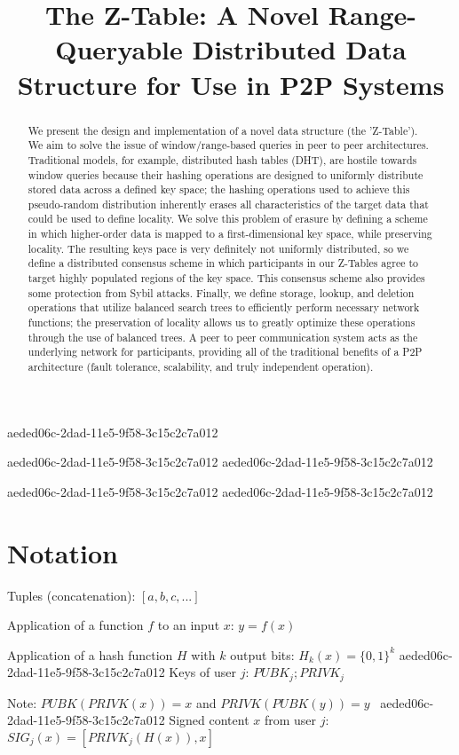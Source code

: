 \documentclass[12pt]{article}
\title{The Z-Table: A Novel Range-Queryable Distributed Data Structure for Use in P2P Systems}
\begin{document}
aeded06c-2dad-11e5-9f58-3c15c2c7a012\maketitle
aeded06c-2dad-11e5-9f58-3c15c2c7a012
aeded06c-2dad-11e5-9f58-3c15c2c7a012\begin{abstract}
We present the design and implementation of a novel data structure (the 'Z-Table'). We aim to solve the issue of window/range-based queries in peer to peer architectures. Traditional models, for example,  distributed hash tables (DHT), are hostile towards window queries because their hashing operations are designed to uniformly distribute stored data across a defined key space; the hashing operations used to achieve this pseudo-random distribution inherently erases all characteristics of the target data that could be used to define locality. We solve this problem of erasure by defining a scheme in which higher-order data is mapped to a first-dimensional key space, while preserving locality. The resulting keys pace is very definitely not uniformly distributed, so we define a distributed consensus scheme in which participants in our Z-Tables agree to target highly populated regions of the key space. This consensus scheme also provides some protection from Sybil attacks. Finally, we define storage, lookup, and deletion operations that utilize balanced search trees to efficiently perform necessary network functions; the preservation of locality allows us to greatly optimize these operations through the use of balanced trees. A peer to peer communication system acts as the underlying network for participants, providing all of the traditional benefits of a P2P architecture (fault tolerance, scalability, and truly independent operation).
\end{abstract}
aeded06c-2dad-11e5-9f58-3c15c2c7a012
aeded06c-2dad-11e5-9f58-3c15c2c7a012\section{Notation}

Tuples (concatenation): $[a,b,c,...]$

Application of a function $f$ to an input $x$: $y=f(x)$

Application of a hash function $H$ with $k$ output bits: $H_{k}(x) = \{0,1\}^k$
aeded06c-2dad-11e5-9f58-3c15c2c7a012
Keys of user $j$: $ PUBK_j; PRIVK_j $

Note: $PUBK(PRIVK(x)) = x$ and $PRIVK(PUBK(y)) = y$~
aeded06c-2dad-11e5-9f58-3c15c2c7a012
Signed content $x$ from user $j$: $SIG_j(x) = \left[ PRIVK_j( H(x) ), x \right]$
\end{document}
